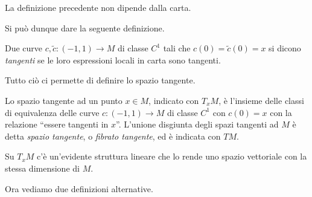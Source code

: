 \begin{proposition}
	La definizione precedente non dipende dalla carta.
\end{proposition}

Si può dunque dare la seguente definizione.
 
\begin{definition} 
	Due curve $c,\tilde{c}:(-1,1)\to M$ di classe $C^1$ tali che $c(0)=\tilde{c}(0)=x$ si dicono \emph{tangenti} se le loro espressioni locali in carta sono tangenti.
\end{definition}

Tutto ciò ci permette di definire lo spazio tangente.
 
\begin{definition}  
	Lo spazio tangente ad un punto $x\in M$, indicato con $T_xM$, è l'insieme delle classi di equivalenza delle curve $c:(-1,1)\to M$ di classe $C^1$ con $c(0)=x$ con la relazione ``essere tangenti in $x$''. L'unione disgiunta degli spazi tangenti ad $M$ è detta \emph{spazio tangente}, o \emph{fibrato tangente}, ed è indicata con $TM$.
\end{definition}
 
 \begin{remark}
  Su $T_xM$ c'è un'evidente struttura lineare che lo rende uno spazio vettoriale con la
  stessa dimensione di $M$.
 \end{remark}

Ora vediamo due definizioni alternative.
 
